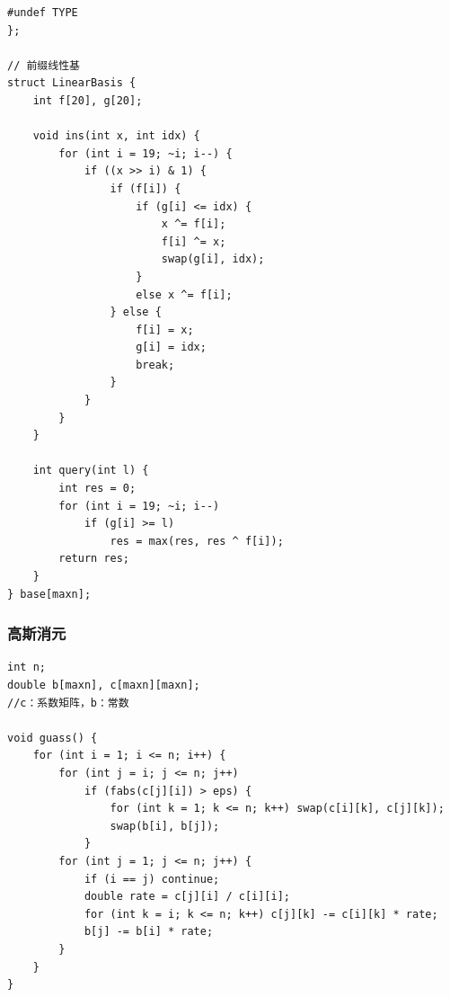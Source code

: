 \documentclass[twoside]{article}
\begin{document}
\begin{lstlisting}
#undef TYPE
};

// 前缀线性基
struct LinearBasis {
    int f[20], g[20];

    void ins(int x, int idx) {
        for (int i = 19; ~i; i--) {
            if ((x >> i) & 1) {
                if (f[i]) {
                    if (g[i] <= idx) {
                        x ^= f[i];
                        f[i] ^= x;
                        swap(g[i], idx);
                    }
                    else x ^= f[i];
                } else {
                    f[i] = x;
                    g[i] = idx;
                    break;
                }
            }
        }
    }

    int query(int l) {
        int res = 0;
        for (int i = 19; ~i; i--)
            if (g[i] >= l)
                res = max(res, res ^ f[i]);
        return res;
    }
} base[maxn];\end{lstlisting}
\subsubsection{高斯消元}
\begin{lstlisting}
int n;
double b[maxn], c[maxn][maxn];
//c：系数矩阵，b：常数

void guass() {
    for (int i = 1; i <= n; i++) {
        for (int j = i; j <= n; j++)
            if (fabs(c[j][i]) > eps) {
                for (int k = 1; k <= n; k++) swap(c[i][k], c[j][k]);
                swap(b[i], b[j]);
            }
        for (int j = 1; j <= n; j++) {
            if (i == j) continue;
            double rate = c[j][i] / c[i][i];
            for (int k = i; k <= n; k++) c[j][k] -= c[i][k] * rate;
            b[j] -= b[i] * rate;
        }
    }
}\end{lstlisting}
\end{document}
